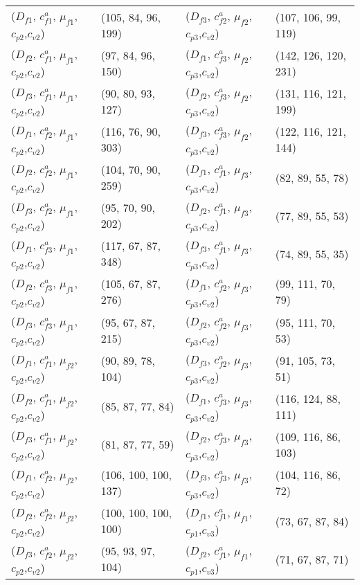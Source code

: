 \documentclass[preprint,12pt]{elsarticle}
\begin{document}
\begin{appendices}
\begin{table}[htbp]
\begin{tabular}{llll}
    ($D_{f1}$, $c^{a}_{f1}$, $\mu_{f1}$, $c_{p2}$,$c_{v2}$) & (105, 84, 96, 199) & ($D_{f3}$, $c^{a}_{f2}$, $\mu_{f2}$, $c_{p3}$,$c_{v2}$) & (107, 106, 99, 119) \\
    ($D_{f2}$, $c^{a}_{f1}$, $\mu_{f1}$, $c_{p2}$,$c_{v2}$) & (97, 84, 96, 150) & ($D_{f1}$, $c^{a}_{f3}$, $\mu_{f2}$, $c_{p3}$,$c_{v2}$) & (142, 126, 120, 231) \\
    ($D_{f3}$, $c^{a}_{f1}$, $\mu_{f1}$, $c_{p2}$,$c_{v2}$) & (90, 80, 93, 127) & ($D_{f2}$, $c^{a}_{f3}$, $\mu_{f2}$, $c_{p3}$,$c_{v2}$) & (131, 116, 121, 199) \\
    ($D_{f1}$, $c^{a}_{f2}$, $\mu_{f1}$, $c_{p2}$,$c_{v2}$) & (116, 76, 90, 303) & ($D_{f3}$, $c^{a}_{f3}$, $\mu_{f2}$, $c_{p3}$,$c_{v2}$) & (122, 116, 121, 144) \\
    ($D_{f2}$, $c^{a}_{f2}$, $\mu_{f1}$, $c_{p2}$,$c_{v2}$) & (104, 70, 90, 259) & ($D_{f1}$, $c^{a}_{f1}$, $\mu_{f3}$, $c_{p3}$,$c_{v2}$) & (82, 89, 55, 78) \\
    ($D_{f3}$, $c^{a}_{f2}$, $\mu_{f1}$, $c_{p2}$,$c_{v2}$) & (95, 70, 90, 202) & ($D_{f2}$, $c^{a}_{f1}$, $\mu_{f3}$, $c_{p3}$,$c_{v2}$) & (77, 89, 55, 53) \\
    ($D_{f1}$, $c^{a}_{f3}$, $\mu_{f1}$, $c_{p2}$,$c_{v2}$) & (117, 67, 87, 348) & ($D_{f3}$, $c^{a}_{f1}$, $\mu_{f3}$, $c_{p3}$,$c_{v2}$) & (74, 89, 55, 35) \\
    ($D_{f2}$, $c^{a}_{f3}$, $\mu_{f1}$, $c_{p2}$,$c_{v2}$) & (105, 67, 87, 276) & ($D_{f1}$, $c^{a}_{f2}$, $\mu_{f3}$, $c_{p3}$,$c_{v2}$) & (99, 111, 70, 79) \\
    ($D_{f3}$, $c^{a}_{f3}$, $\mu_{f1}$, $c_{p2}$,$c_{v2}$) & (95, 67, 87, 215) & ($D_{f2}$, $c^{a}_{f2}$, $\mu_{f3}$, $c_{p3}$,$c_{v2}$) & (95, 111, 70, 53) \\
    ($D_{f1}$, $c^{a}_{f1}$, $\mu_{f2}$, $c_{p2}$,$c_{v2}$) & (90, 89, 78, 104) & ($D_{f3}$, $c^{a}_{f2}$, $\mu_{f3}$, $c_{p3}$,$c_{v2}$) & (91, 105, 73, 51) \\
    ($D_{f2}$, $c^{a}_{f1}$, $\mu_{f2}$, $c_{p2}$,$c_{v2}$) & (85, 87, 77, 84) & ($D_{f1}$, $c^{a}_{f3}$, $\mu_{f3}$, $c_{p3}$,$c_{v2}$) & (116, 124, 88, 111) \\
    ($D_{f3}$, $c^{a}_{f1}$, $\mu_{f2}$, $c_{p2}$,$c_{v2}$) & (81, 87, 77, 59) & ($D_{f2}$, $c^{a}_{f3}$, $\mu_{f3}$, $c_{p3}$,$c_{v2}$) & (109, 116, 86, 103) \\
    ($D_{f1}$, $c^{a}_{f2}$, $\mu_{f2}$, $c_{p2}$,$c_{v2}$) & (106, 100, 100, 137) & ($D_{f3}$, $c^{a}_{f3}$, $\mu_{f3}$, $c_{p3}$,$c_{v2}$) & (104, 116, 86, 72) \\
    ($D_{f2}$, $c^{a}_{f2}$, $\mu_{f2}$, $c_{p2}$,$c_{v2}$) & (100, 100, 100, 100) & ($D_{f1}$, $c^{a}_{f1}$, $\mu_{f1}$, $c_{p1}$,$c_{v3}$) & (73, 67, 87, 84) \\
    ($D_{f3}$, $c^{a}_{f2}$, $\mu_{f2}$, $c_{p2}$,$c_{v2}$) & (95, 93, 97, 104) & ($D_{f2}$, $c^{a}_{f1}$, $\mu_{f1}$, $c_{p1}$,$c_{v3}$) & (71, 67, 87, 71) \\
    \bottomrule
    \end{tabular}%
  \label{tab:oppdetailresults2}%
\end{table}%


\end{appendices}
\end{document}
